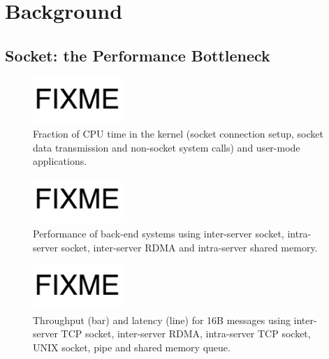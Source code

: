 \section{Background}
\label{sec:background}

\subsection{Socket: the Performance Bottleneck}

\begin{figure}[t]
	\centering
	\includegraphics[width=0.3\textwidth]{images/fixme}
	\caption{Fraction of CPU time in the kernel (socket connection setup, socket data transmission and non-socket system calls) and user-mode applications.}
	\label{fig:socket-kernel-time}
\end{figure}

\begin{figure}[t]
	\centering
	\includegraphics[width=0.3\textwidth]{images/fixme}
	\caption{Performance of back-end systems using inter-server socket, intra-server socket, inter-server RDMA and intra-server shared memory.}
	\label{fig:backend-performance}
\end{figure}

\begin{figure}[t]
	\centering
	\includegraphics[width=0.3\textwidth]{images/fixme}
	\caption{Throughput (bar) and latency (line) for 16B messages using inter-server TCP socket, inter-server RDMA, intra-server TCP socket, UNIX socket, pipe and shared memory queue.}
	\label{fig:socket-comparison}
\end{figure}


